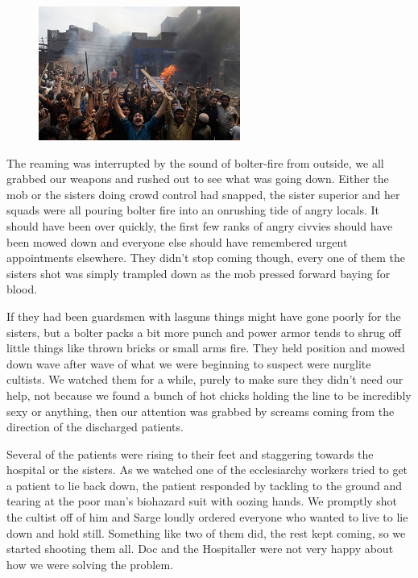 \begin{figure}
	\begin{center}
		\includegraphics[width=\figwidth]{pics/6/23.png}
	\end{center}
\end{figure}
The reaming was interrupted by the sound of bolter-fire from outside, we all grabbed our weapons and rushed out to see what was going down. 
Either the mob or the sisters doing crowd control had snapped, the sister superior and her squads were all pouring bolter fire into an onrushing tide of angry locals. 
It should have been over quickly, the first few ranks of angry civvies should have been mowed down and everyone else should have remembered urgent appointments elsewhere. 
They didn't stop coming though, every one of them the sisters shot was simply trampled down as the mob pressed forward baying for blood.

If they had been guardsmen with lasguns things might have gone poorly for the sisters, but a bolter packs a bit more punch and power armor tends to shrug off little things like thrown bricks or small arms fire. 
They held position and mowed down wave after wave of what we were beginning to suspect were nurglite cultists. 
We watched them for a while, purely to make sure they didn't need our help, not because we found a bunch of hot chicks holding the line to be incredibly sexy or anything, then our attention was grabbed by screams coming from the direction of the discharged patients.

Several of the patients were rising to their feet and staggering towards the hospital or the sisters. 
As we watched one of the ecclesiarchy workers tried to get a patient to lie back down, the patient responded by tackling to the ground and tearing at the poor man's biohazard suit with oozing hands. 
We promptly shot the cultist off of him and Sarge loudly ordered everyone who wanted to live to lie down and hold still. 
Something like two of them did, the rest kept coming, so we started shooting them all. 
Doc and the Hospitaller were not very happy about how we were solving the problem.

